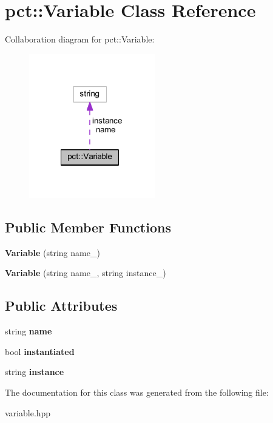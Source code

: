 \hypertarget{classpct_1_1_variable}{\section{pct\-:\-:Variable Class Reference}
\label{classpct_1_1_variable}
}


Collaboration diagram for pct\-:\-:Variable\-:\nopagebreak
\begin{figure}[H]
\begin{center}
\leavevmode
\includegraphics[width=155pt]{classpct_1_1_variable__coll__graph}
\end{center}
\end{figure}
\subsection*{Public Member Functions}
\begin{DoxyCompactItemize}
\item 
\hypertarget{classpct_1_1_variable_afc1e4759b2c0b38129b0b3830b6f6842}{{\bfseries Variable} (string name\-\_\-)}\label{classpct_1_1_variable_afc1e4759b2c0b38129b0b3830b6f6842}

\item 
\hypertarget{classpct_1_1_variable_aff094da93ed282620985ef59af4a834a}{{\bfseries Variable} (string name\-\_\-, string instance\-\_\-)}\label{classpct_1_1_variable_aff094da93ed282620985ef59af4a834a}

\end{DoxyCompactItemize}
\subsection*{Public Attributes}
\begin{DoxyCompactItemize}
\item 
\hypertarget{classpct_1_1_variable_aa8b7c67527f09244e621002317b67ac6}{string {\bfseries name}}\label{classpct_1_1_variable_aa8b7c67527f09244e621002317b67ac6}

\item 
\hypertarget{classpct_1_1_variable_a2193bea3a0433c6fdcf0be593388edc1}{bool {\bfseries instantiated}}\label{classpct_1_1_variable_a2193bea3a0433c6fdcf0be593388edc1}

\item 
\hypertarget{classpct_1_1_variable_ac0d995115059874a355e08020fd8d65f}{string {\bfseries instance}}\label{classpct_1_1_variable_ac0d995115059874a355e08020fd8d65f}

\end{DoxyCompactItemize}


The documentation for this class was generated from the following file\-:\begin{DoxyCompactItemize}
\item 
variable.\-hpp\end{DoxyCompactItemize}

